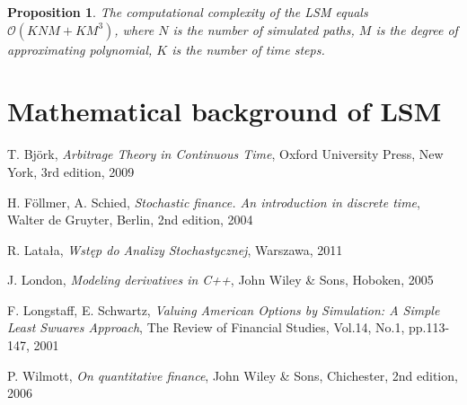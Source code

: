\documentclass[a4paper,12pt, oneside]{book}
\newtheorem{prop}[thm]{Proposition}
\theoremstyle{definition}
\theoremstyle{remark}
\begin{document}
\begin{prop}
 The computational complexity of the LSM equals $\mathcal{O}(KNM + KM^3)$, where $N$ is the number of simulated paths, $M$ is the degree of approximating polynomial, $K$ is the number of time steps.
\end{prop}

\section{Mathematical background of LSM}


\begin{thebibliography}{99}

T. Bj\"{o}rk, \emph{Arbitrage Theory in Continuous Time}, Oxford University Press,  New York, 3rd edition, 2009

H. F\"{o}llmer, A. Schied, \emph{Stochastic finance. An introduction in discrete time}, Walter de Gruyter, Berlin, 2nd edition, 2004

R. Latała, \emph{Wstęp do Analizy Stochastycznej}, Warszawa, 2011

J. London, \emph{Modeling derivatives in C++}, John Wiley \& Sons, Hoboken, 2005

F. Longstaff, E. Schwartz, \emph{Valuing American Options by Simulation: A Simple Least Swuares Approach}, The Review of Financial Studies, Vol.14, No.1, pp.113-147, 2001

P. Wilmott, \emph{On quantitative finance}, John Wiley \& Sons, Chichester, 2nd edition, 2006

\end{thebibliography}
\end{document}
